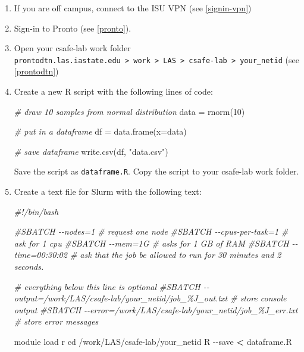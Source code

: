 \documentclass[
]{book}
\newenvironment{Shaded}{\begin{snugshade}}{\end{snugshade}}
\newcommand{\AttributeTok}[1]{\textcolor[rgb]{0.77,0.63,0.00}{#1}}
\newcommand{\BuiltInTok}[1]{#1}
\newcommand{\CommentTok}[1]{\textcolor[rgb]{0.56,0.35,0.01}{\textit{#1}}}
\newcommand{\DecValTok}[1]{\textcolor[rgb]{0.00,0.00,0.81}{#1}}
\newcommand{\ExtensionTok}[1]{#1}
\newcommand{\FunctionTok}[1]{\textcolor[rgb]{0.00,0.00,0.00}{#1}}
\newcommand{\NormalTok}[1]{#1}
\newcommand{\OperatorTok}[1]{\textcolor[rgb]{0.81,0.36,0.00}{\textbf{#1}}}
\newcommand{\OtherTok}[1]{\textcolor[rgb]{0.56,0.35,0.01}{#1}}
\newcommand{\StringTok}[1]{\textcolor[rgb]{0.31,0.60,0.02}{#1}}
\begin{document}
\begin{enumerate}
\def\labelenumi{\arabic{enumi}.}
\item
  If you are off campus, connect to the ISU VPN (see \ref{signin-vpn})
\item
  Sign-in to Pronto (see \ref{pronto}).
\item
  Open your csafe-lab work folder \texttt{prontodtn.las.iastate.edu\ \textgreater{}\ work\ \textgreater{}\ LAS\ \textgreater{}\ csafe-lab\ \textgreater{}\ your\_netid} (see \ref{prontodtn})
\item
  Create a new R script with the following lines of code:

\begin{Shaded}
\begin{Highlighting}[]
\CommentTok{\# draw 10 samples from normal distribution}
\NormalTok{data }\OtherTok{=} \FunctionTok{rnorm}\NormalTok{(}\DecValTok{10}\NormalTok{)}

\CommentTok{\# put in a dataframe}
\NormalTok{df }\OtherTok{=} \FunctionTok{data.frame}\NormalTok{(}\AttributeTok{x=}\NormalTok{data)}

\CommentTok{\# save dataframe}
\FunctionTok{write.csv}\NormalTok{(df, }\StringTok{"data.csv"}\NormalTok{)}
\end{Highlighting}
\end{Shaded}

  Save the script as \texttt{dataframe.R}. Copy the script to your csafe-lab work folder.
\item
  Create a text file for Slurm with the following text:

\begin{Shaded}
\begin{Highlighting}[]
\CommentTok{\#!/bin/bash}

\CommentTok{\#SBATCH {-}{-}nodes=1 \# request one node}
\CommentTok{\#SBATCH {-}{-}cpus{-}per{-}task=1  \# ask for 1 cpu}
\CommentTok{\#SBATCH {-}{-}mem=1G \#  asks for 1 GB of RAM}
\CommentTok{\#SBATCH {-}{-}time=00:30:02 \# ask that the job be allowed to run for 30 minutes and 2 seconds.}

\CommentTok{\# everything below this line is optional}
\CommentTok{\#SBATCH {-}{-}output=/work/LAS/csafe{-}lab/your\_netid/job\_\%J\_out.txt \# store console output}
\CommentTok{\#SBATCH {-}{-}error=/work/LAS/csafe{-}lab/your\_netid/job\_\%J\_err.txt \# store error messages}

\ExtensionTok{module}\NormalTok{ load r}
\BuiltInTok{cd}\NormalTok{ /work/LAS/csafe{-}lab/your\_netid}
\ExtensionTok{R} \AttributeTok{{-}{-}save} \OperatorTok{\textless{}}\NormalTok{ dataframe.R}
\end{Highlighting}
\end{Shaded}


\end{enumerate}
\end{document}
